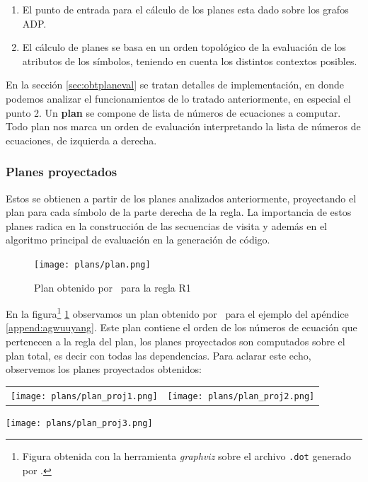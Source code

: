 \begin{enumerate}
\item El punto de entrada para el cálculo de los planes esta dado sobre los grafos ADP. 
\item El cálculo de planes se basa en un orden topológico de la evaluación de los atributos de los símbolos, teniendo en cuenta los distintos contextos posibles.
\end{enumerate}

En la sección \ref{sec:obtplaneval} se tratan detalles de implementación, en donde podemos analizar el funcionamientos de lo tratado anteriormente, en especial el punto 2.
Un \textbf{plan} se compone de lista de números de ecuaciones a computar. Todo plan nos marca un orden de evaluación interpretando la lista de números de ecuaciones, de izquierda a derecha.

\subsubsection*{Planes proyectados}

Estos se obtienen a partir de los planes analizados anteriormente, proyectando el plan para cada símbolo de la parte derecha de la regla. La importancia de estos planes radica en la construcción de las secuencias de visita y además en el algoritmo principal de evaluación en la generación de código.

\begin{figure}[h!]\centering
 \texttt{[image: plans/plan.png]}
\caption{\label{fig:plan}Plan obtenido por \maggen\ para la regla R1}
\end{figure}

En la figura\footnote{Figura obtenida con la herramienta \textit{graphviz} sobre el archivo \texttt{.dot} generado por \maggen.} \ref{fig:plan} observamos un plan obtenido por \maggen\ para el ejemplo del apéndice \ref{append:agwuuyang}. Este plan contiene el orden de los números de ecuación que pertenecen a la regla del plan, los planes proyectados son computados sobre el plan total, es decir con todas las dependencias. Para aclarar este echo, observemos los planes proyectados obtenidos:\\

\begin{tabular}{l l}
\texttt{[image: plans/plan\_proj1.png]} &
\texttt{[image: plans/plan\_proj2.png]} 
\end{tabular}

\begin{center}
 \texttt{[image: plans/plan\_proj3.png]}
\end{center}

